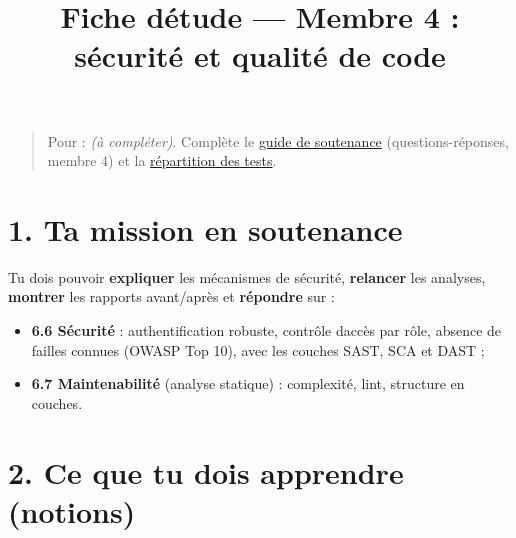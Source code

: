 \documentclass[
  11pt,
]{article}
\title{Fiche d\textquotesingle étude --- Membre 4 : sécurité et qualité
de code}
\author{}
\date{}
\providecommand{\tightlist}{%
  \setlength{\itemsep}{0pt}\setlength{\parskip}{0pt}}
\let\tdmorigine\tableofcontents
\renewcommand{\tableofcontents}{\tdmorigine\newpage}
\begin{document}
\maketitle

\renewcommand*\contentsname{Table des matières}
{
\hypersetup{linkcolor=}
\setcounter{tocdepth}{3}
\tableofcontents
}
\begin{quote}
Pour : \emph{(à compléter)}. Complète le \href{SOUTENANCE.pdf}{guide de
soutenance} (questions-réponses, membre 4) et la
\href{REPARTITION_TESTS.pdf}{répartition des tests}.
\end{quote}

\section{1. Ta mission en soutenance}\label{1-ta-mission-en-soutenance}

Tu dois pouvoir \textbf{expliquer} les mécanismes de sécurité,
\textbf{relancer} les analyses, \textbf{montrer} les rapports
avant/après et \textbf{répondre} sur :

\begin{itemize}
\tightlist
\item
  \textbf{6.6 Sécurité} : authentification robuste, contrôle
  d\textquotesingle accès par rôle, absence de failles connues (OWASP
  Top 10), avec les couches SAST, SCA et DAST ;
\item
  \textbf{6.7 Maintenabilité} (analyse statique) : complexité, lint,
  structure en couches.
\end{itemize}

\section{2. Ce que tu dois apprendre
(notions)}\label{2-ce-que-tu-dois-apprendre-notions}
\end{document}
